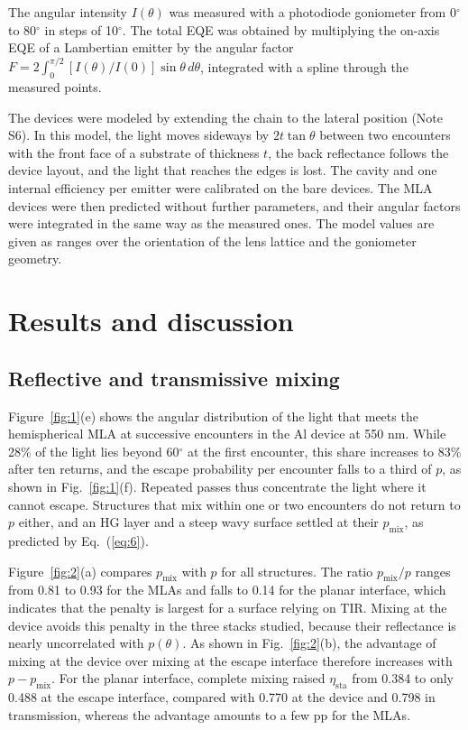 \documentclass{optica-article}
\begin{document}
The angular intensity $I(\theta)$ was measured with a photodiode goniometer from 0\ensuremath{^\circ} to 80\ensuremath{^\circ} in steps of 10\ensuremath{^\circ}. The total EQE was obtained by multiplying the on-axis EQE of a Lambertian emitter by the angular factor $F = 2\int_0^{\pi/2}[I(\theta)/I(0)]\sin\theta\,d\theta$, integrated with a spline through the measured points.

The devices were modeled by extending the chain to the lateral position (Note S6). In this model, the light moves sideways by $2t\tan\theta$ between two encounters with the front face of a substrate of thickness $t$, the back reflectance follows the device layout, and the light that reaches the edges is lost. The cavity and one internal efficiency per emitter were calibrated on the bare devices. The MLA devices were then predicted without further parameters, and their angular factors were integrated in the same way as the measured ones. The model values are given as ranges over the orientation of the lens lattice and the goniometer geometry.

\section{Results and discussion}

\subsection{Reflective and transmissive mixing}

Figure~\ref{fig:1}(e) shows the angular distribution of the light that meets the hemispherical MLA at successive encounters in the Al device at 550 nm. While 28\% of the light lies beyond 60\ensuremath{^\circ} at the first encounter, this share increases to 83\% after ten returns, and the escape probability per encounter falls to a third of $p$, as shown in Fig.~\ref{fig:1}(f). Repeated passes thus concentrate the light where it cannot escape. Structures that mix within one or two encounters do not return to $p$ either, and an HG layer and a steep wavy surface settled at their $p_{\mathrm{mix}}$, as predicted by Eq.~(\ref{eq:6}).

Figure~\ref{fig:2}(a) compares $p_{\mathrm{mix}}$ with $p$ for all structures. The ratio $p_{\mathrm{mix}}/p$ ranges from 0.81 to 0.93 for the MLAs and falls to 0.14 for the planar interface, which indicates that the penalty is largest for a surface relying on TIR. Mixing at the device avoids this penalty in the three stacks studied, because their reflectance is nearly uncorrelated with $p(\theta)$. As shown in Fig.~\ref{fig:2}(b), the advantage of mixing at the device over mixing at the escape interface therefore increases with $p - p_{\mathrm{mix}}$. For the planar interface, complete mixing raised $\eta_{\mathrm{sta}}$ from 0.384 to only 0.488 at the escape interface, compared with 0.770 at the device and 0.798 in transmission, whereas the advantage amounts to a few pp for the MLAs.
\end{document}
